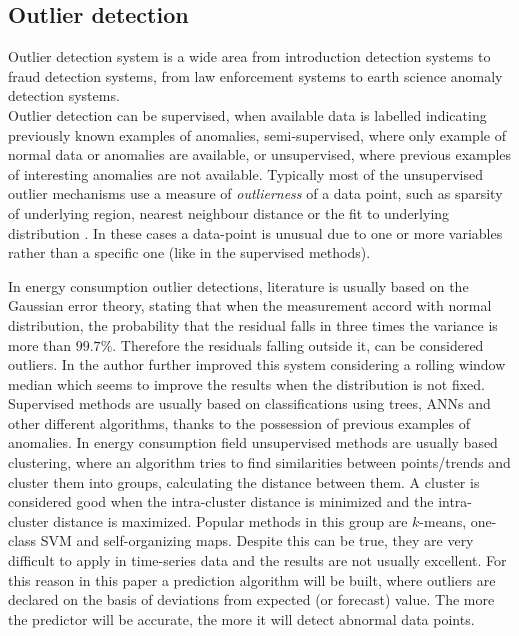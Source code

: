 \documentclass{sig-alternate-sigmod07}
\begin{document}
\subsection{Outlier detection}
Outlier detection system is a wide area from introduction detection systems to fraud detection systems, from law enforcement systems to earth science anomaly detection systems.\\
Outlier detection can be supervised, when available data is labelled indicating previously known examples of anomalies, semi-supervised, where only example of normal data or anomalies are available, or unsupervised, where previous examples of interesting anomalies are not available. Typically most of the unsupervised outlier mechanisms use a measure of \emph{outlierness} of a data point, such as sparsity of underlying region, nearest neighbour distance or the fit to underlying distribution \cite{aggarwal2013outlier}. In these cases a data-point is unusual due to one or more variables rather than a specific one (like in the supervised methods).

In energy consumption outlier detections, literature is usually based on the Gaussian error theory, stating that when the measurement accord with normal distribution, the probability that the residual falls in three times the variance is more than $99.7\%$. Therefore the residuals falling outside it, can be considered outliers. 
In \cite{ferdowsi2013neural} the author further improved this system considering a rolling window median which seems to improve the results when the distribution is not fixed. Supervised methods are usually based on classifications using trees, ANNs and other different algorithms, thanks to the possession of previous examples of anomalies. In energy consumption field unsupervised methods are usually based clustering, where an algorithm tries to find similarities between points/trends and cluster them into groups, calculating the distance between them. A cluster is considered good when the intra-cluster distance is minimized and the intra-cluster distance is maximized. Popular methods in this group are $k$-means, one-class SVM and self-organizing maps. Despite this can be true, they are very difficult to apply in time-series data and the results are not usually excellent. For this reason in this paper a prediction algorithm will be built, where outliers are declared on the basis of deviations from expected (or forecast) value. The more the predictor will be accurate, the more it will detect abnormal data points.
\end{document}
